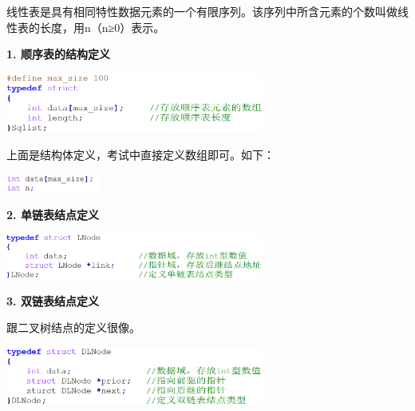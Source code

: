 线性表是具有相同特性数据元素的一个有限序列。该序列中所含元素的个数叫做线性表的长度，用n（n≥0）表示。

{\textbf{1. 顺序表的结构定义}}{}

\includegraphics[width=3.33333in,height=0.77083in]{png-jpeg-pics/858F0B2FB24FD4CAC49A48E3B93C504F.png}

{上面是结构体定义，考试中直接定义数组即可。如下：\\
}

\includegraphics[width=1.25000in,height=0.22917in]{png-jpeg-pics/BB30D5618AFCED398847C5DFD44A84A8.png}

{\textbf{2. 单链表结点定义}}

\includegraphics[width=3.33333in,height=0.58333in]{png-jpeg-pics/A6664F2AC886BAD99E87039DD7E68251.png}

{\textbf{{3. 双链表结点定义}}\\
}

{跟二叉树结点的定义很像。\\
}

\includegraphics[width=3.33333in,height=0.75000in]{png-jpeg-pics/B2D7F23BD5AAA4BC6D2D78B5E94D4612.png}
